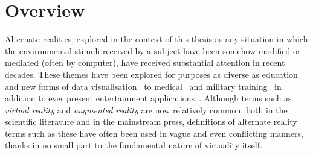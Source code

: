 



\section{Overview}

Alternate realities, explored in the context of this thesis as any situation in which the environmental stimuli received by a subject have been somehow modified or mediated (often by computer), have received substantial attention in recent decades. These themes have been explored for purposes as diverse as education~\cite{Warburton2009} and new forms of data visualisation~\cite{Coleman2009} to medical~\cite{TenEyck2011} and military training~\cite{Qiu2009} in addition to ever present entertainment applications~\cite{Scherrer2008}. Although terms such as \textit{virtual reality} and \textit{augmented reality} are now relatively common, both in the scientific literature and in the mainstream press, definitions of alternate reality terms such as these have often been used in vague and even conflicting manners, thanks in no small part to the fundamental nature of virtuality itself.

